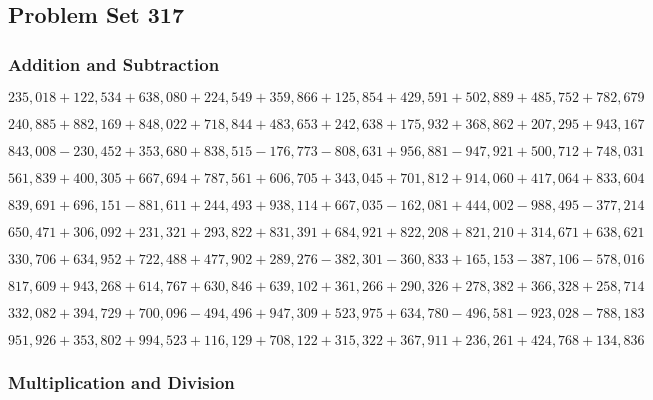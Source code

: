 \hypertarget{problem-set-317}{%
\subsection{Problem Set 317}\label{problem-set-317}}

\hypertarget{addition-and-subtraction}{%
\subsubsection{Addition and
Subtraction}\label{addition-and-subtraction}}

\(235,018+122,534+638,080+224,549+359,866+125,854+429,591+502,889+485,752+782,679\)

\(240,885+882,169+848,022+718,844+483,653+242,638+175,932+368,862+207,295+943,167\)

\(843,008-230,452+353,680+838,515-176,773-808,631+956,881-947,921+500,712+748,031\)

\(561,839+400,305+667,694+787,561+606,705+343,045+701,812+914,060+417,064+833,604\)

\(839,691+696,151-881,611+244,493+938,114+667,035-162,081+444,002-988,495-377,214\)

\(650,471+306,092+231,321+293,822+831,391+684,921+822,208+821,210+314,671+638,621\)

\(330,706+634,952+722,488+477,902+289,276-382,301-360,833+165,153-387,106-578,016\)

\(817,609+943,268+614,767+630,846+639,102+361,266+290,326+278,382+366,328+258,714\)

\(332,082+394,729+700,096-494,496+947,309+523,975+634,780-496,581-923,028-788,183\)

\(951,926+353,802+994,523+116,129+708,122+315,322+367,911+236,261+424,768+134,836\)

\hypertarget{multiplication-and-division}{%
\subsubsection{Multiplication and
Division}\label{multiplication-and-division}}

